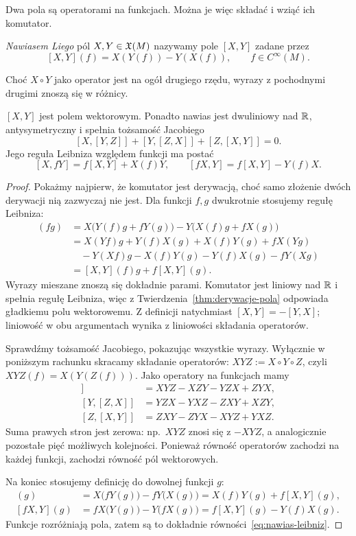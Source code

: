 Dwa pola są operatorami na funkcjach. Można je więc składać i wziąć
ich komutator.
\begin{definicja}
\emph{Nawiasem Liego} pól $X,Y\in\mathfrak X(M)$ nazywamy pole $[X,Y]$ zadane przez
\begin{equation}\label{eq:nawias-def}
 [X,Y](f)=X(Y(f))-Y(X(f)),\qquad f\in C^\infty(M).
\end{equation}
\end{definicja}

Choć $X\circ Y$ jako operator jest na ogół drugiego rzędu, wyrazy z
pochodnymi drugimi znoszą się w różnicy.
\begin{fakt}\label{fakt:nawias-wlasnosci}
$[X,Y]$ jest polem wektorowym. Ponadto nawias jest dwuliniowy nad $\mathbb{R}$,
antysymetryczny i spełnia tożsamość Jacobiego
\[
 [X,[Y,Z]]+[Y,[Z,X]]+[Z,[X,Y]]=0.
\]
Jego reguła Leibniza względem funkcji ma postać
\begin{equation}\label{eq:nawias-leibniz}
 [X,fY]=f[X,Y]+X(f)Y,\qquad [fX,Y]=f[X,Y]-Y(f)X.
\end{equation}
\end{fakt}
\begin{proof}
Pokażmy najpierw, że komutator jest derywacją, choć samo
złożenie dwóch derywacji nią zazwyczaj nie jest.
Dla funkcji $f,g$ dwukrotnie stosujemy regułę Leibniza:
\begin{align*}
[X,Y](fg)
&=X\bigl(Y(f)g+fY(g)\bigr)
  -Y\bigl(X(f)g+fX(g)\bigr)\\
&=X(Yf)g+Y(f)X(g)+X(f)Y(g)+fX(Yg)\\
&\quad-Y(Xf)g-X(f)Y(g)-Y(f)X(g)-fY(Xg)\\
&=[X,Y](f)g+f[X,Y](g).
\end{align*}
Wyrazy mieszane znoszą się dokładnie parami. Komutator
jest liniowy nad $\mathbb{R}$ i spełnia regułę Leibniza,
więc z Twierdzenia~\ref{thm:derywacje-pola} odpowiada
gładkiemu polu wektorowemu. Z definicji natychmiast
$[X,Y]=-[Y,X]$; liniowość w obu argumentach wynika
z liniowości składania operatorów.

Sprawdźmy tożsamość Jacobiego, pokazując wszystkie
wyrazy. Wyłącznie w poniższym rachunku skracamy składanie
operatorów: $XYZ:=X\circ Y\circ Z$, czyli
$XYZ(f)=X(Y(Z(f)))$. Jako operatory na funkcjach mamy
\begin{align*}
[X,[Y,Z]]&=XYZ-XZY-YZX+ZYX,\\
[Y,[Z,X]]&=YZX-YXZ-ZXY+XZY,\\
[Z,[X,Y]]&=ZXY-ZYX-XYZ+YXZ.
\end{align*}
Suma prawych stron jest zerowa: np.\ $XYZ$ znosi się
z $-XYZ$, a analogicznie pozostałe pięć możliwych
kolejności. Ponieważ równość operatorów zachodzi na
każdej funkcji, zachodzi równość pól wektorowych.

Na koniec stosujemy definicję do dowolnej funkcji $g$:
\begin{align*}
[X,fY](g)
 &=X\bigl(fY(g)\bigr)-fY\bigl(X(g)\bigr)
  =X(f)Y(g)+f[X,Y](g),\\
[fX,Y](g)
 &=fX\bigl(Y(g)\bigr)-Y\bigl(fX(g)\bigr)
  =f[X,Y](g)-Y(f)X(g).
\end{align*}
Funkcje rozróżniają pola, zatem są to dokładnie
równości~\eqref{eq:nawias-leibniz}.
\end{proof}


